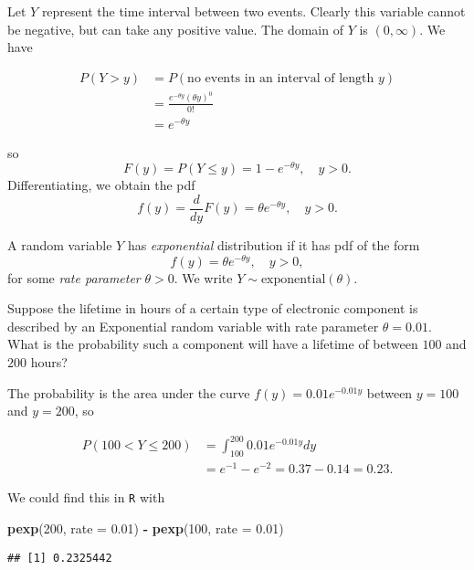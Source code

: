 \documentclass[]{book}
\newenvironment{Shaded}{\begin{snugshade}}{\end{snugshade}}
\newcommand{\KeywordTok}[1]{\textcolor[rgb]{0.13,0.29,0.53}{\textbf{#1}}}
\newcommand{\DataTypeTok}[1]{\textcolor[rgb]{0.13,0.29,0.53}{#1}}
\newcommand{\DecValTok}[1]{\textcolor[rgb]{0.00,0.00,0.81}{#1}}
\newcommand{\FloatTok}[1]{\textcolor[rgb]{0.00,0.00,0.81}{#1}}
\newcommand{\StringTok}[1]{\textcolor[rgb]{0.31,0.60,0.02}{#1}}
\newcommand{\OperatorTok}[1]{\textcolor[rgb]{0.81,0.36,0.00}{\textbf{#1}}}
\newcommand{\NormalTok}[1]{#1}
\theoremstyle{definition}
\theoremstyle{definition}
\theoremstyle{definition}
\theoremstyle{remark}
\let\BeginKnitrBlock\begin \let\EndKnitrBlock\end
\begin{document}
Let \(Y\) represent the time interval between two events. Clearly this
variable cannot be negative, but can take any positive value. The domain
of \(Y\) is \((0, \infty)\). We have

\begin{align*}
P(Y > y) &= P(\text{no events in an interval of length $y$}) \\
&= \frac{e^{-\theta y} (\theta y)^0}{0!} \\
&= e^{-\theta y}
\end{align*}

so \[F(y) = P(Y \leq y) = 1 - e^{-\theta y}, \quad y > 0.\]
Differentiating, we obtain the pdf
\[f(y) = \frac{d}{dy} F(y) = \theta e^{-\theta y}, \quad y > 0.\]

\BeginKnitrBlock{definition}
\protect\hypertarget{def:unnamed-chunk-6}{}{\label{def:unnamed-chunk-6} }A
random variable \(Y\) has \emph{exponential} distribution if it has pdf
of the form \[f(y) = \theta e^{-\theta y}, \quad y > 0,\] for some
\emph{rate parameter} \(\theta > 0\). We write
\(Y \sim \text{exponential}(\theta)\).
\EndKnitrBlock{definition}

\BeginKnitrBlock{example}
\protect\hypertarget{exm:unnamed-chunk-7}{}{\label{exm:unnamed-chunk-7} }
Suppose the lifetime in hours of a certain type of electronic component
is described by an Exponential random variable with rate parameter
\(\theta = 0.01\). What is the probability such a component will have a
lifetime of between \(100\) and \(200\) hours?

The probability is the area under the curve \(f(y) = 0.01 e^{-0.01 y}\)
between \(y = 100\) and \(y = 200\), so

\begin{align*}
P(100 < Y \leq 200) &= \int_{100}^{200} 0.01e^{-0.01 y} dy \\
&= e^{-1} - e^{-2} = 0.37 - 0.14 = 0.23.
\end{align*}
\EndKnitrBlock{example} We could find this in \texttt{R} with

\begin{Shaded}
\begin{Highlighting}[]
\KeywordTok{pexp}\NormalTok{(}\DecValTok{200}\NormalTok{, }\DataTypeTok{rate =} \FloatTok{0.01}\NormalTok{) }\OperatorTok{-}\StringTok{ }\KeywordTok{pexp}\NormalTok{(}\DecValTok{100}\NormalTok{, }\DataTypeTok{rate =} \FloatTok{0.01}\NormalTok{)}
\end{Highlighting}
\end{Shaded}

\begin{verbatim}
## [1] 0.2325442
\end{verbatim}
\end{document}
